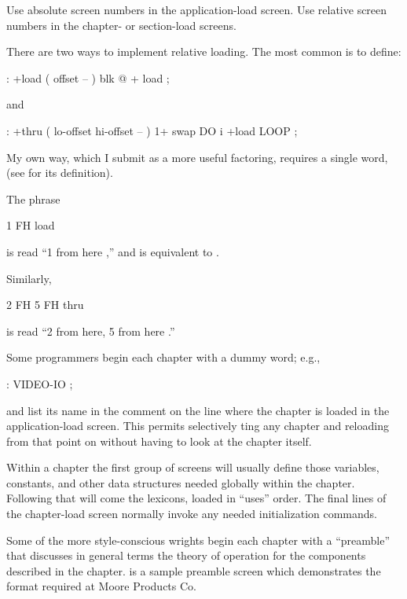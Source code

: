 %
\begin{tip}
Use absolute screen numbers in the application-load screen.  Use
relative screen numbers in the chapter- or section-load screens.
\end{tip}
There are two ways to implement relative loading.
The most common is to define:
\begin{Code}
: +load  ( offset -- )  blk @ +  load ;
\end{Code}
and
\begin{Code}
: +thru  ( lo-offset hi-offset -- )
     1+ swap DO  i +load  LOOP ;
\end{Code}
My own way, which I submit as a more useful factoring, requires a
single word,  (see  for its definition).

The phrase
\begin{Code}
1 FH load
\end{Code}
is read ``1 from here ,'' and is equivalent
to .

Similarly,
\begin{Code}
2 FH   5 FH thru
\end{Code}
is read ``2 from here, 5 from here .''

Some programmers begin each chapter with a dummy word; e.g.,
\begin{Code}
: VIDEO-IO ;
\end{Code}
and list its name in the comment on the line where the chapter is
loaded in the application-load screen.  This permits selectively
ting any chapter and reloading from that point on
without having to look at the chapter itself.

Within a chapter the first group of screens will usually define those
variables, constants, and other data structures needed globally within
the chapter.  Following that will come the lexicons, loaded in
``uses'' order.  The final lines of the chapter-load screen normally
invoke any needed initialization commands.

%
Some of the more style-conscious \Forth{}wrights begin each chapter
with a ``preamble'' that discusses in general terms the theory of
operation for the components described in the chapter.  
is a sample preamble screen which demonstrates the format required at
Moore Products Co.

